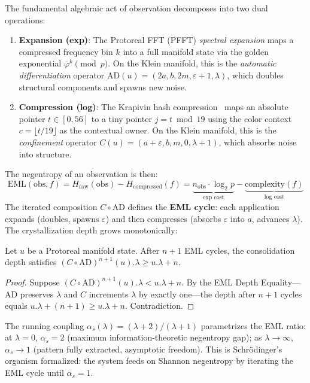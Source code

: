 The fundamental algebraic act of observation decomposes into two dual operations:

\begin{enumerate}
    \item \textbf{Expansion (exp)}: The Protoreal FFT (PFFT) \emph{spectral expansion} maps a compressed frequency bin $k$ into a full manifold state via the golden exponential $\bar\varphi^k \pmod{p}$. On the Klein manifold, this is the \emph{automatic differentiation} operator $\mathrm{AD}(u) = (2a, b, 2m, \varepsilon + 1, \lambda)$, which doubles structural components and spawns new noise.
    \item \textbf{Compression (log)}: The Krapivin hash compression~\cite{krapivin2025optimal} maps an absolute pointer $t \in [0, 56]$ to a tiny pointer $j = t \bmod 19$ using the color context $c = \lfloor t/19 \rfloor$ as the contextual owner. On the Klein manifold, this is the \emph{confinement} operator $C(u) = (a + \varepsilon, b, m, 0, \lambda + 1)$, which absorbs noise into structure.
\end{enumerate}

The negentropy of an observation is then:
\begin{equation}
    \mathrm{EML}(\mathrm{obs}, f) = H_{\mathrm{raw}}(\mathrm{obs}) - H_{\mathrm{compressed}}(f) = \underbrace{n_{\mathrm{obs}} \cdot \log_2 p}_{\text{exp cost}} - \underbrace{\text{complexity}(f)}_{\text{log cost}}
\end{equation}
The iterated composition $C \circ \mathrm{AD}$ defines the \textbf{EML cycle}: each application expands (doubles, spawns $\varepsilon$) and then compresses (absorbs $\varepsilon$ into $a$, advances $\lambda$). The crystallization depth grows monotonically:

\begin{theorem}
\label{thm:monotone_negentropy}
Let $u$ be a Protoreal manifold state. After $n+1$ EML cycles, the consolidation depth satisfies $(C \circ \mathrm{AD})^{n+1}(u).\lambda \geq u.\lambda + n$. 
\end{theorem}
\begin{proof}
Suppose $(C \circ \mathrm{AD})^{n+1}(u).\lambda < u.\lambda + n$. By the EML Depth Equality---$\mathrm{AD}$ preserves $\lambda$ and $C$ increments $\lambda$ by exactly one---the depth after $n+1$ cycles equals $u.\lambda + (n+1) \geq u.\lambda + n$. Contradiction. \qedhere
\end{proof}

The running coupling $\alpha_s(\lambda) = (\lambda + 2)/(\lambda + 1)$ parametrizes the EML ratio: at $\lambda = 0$, $\alpha_s = 2$ (maximum information-theoretic negentropy gap); as $\lambda \to \infty$, $\alpha_s \to 1$ (pattern fully extracted, asymptotic freedom). This is Schr\"odinger's organism formalized: the system feeds on Shannon negentropy by iterating the EML cycle until $\alpha_s = 1$.

